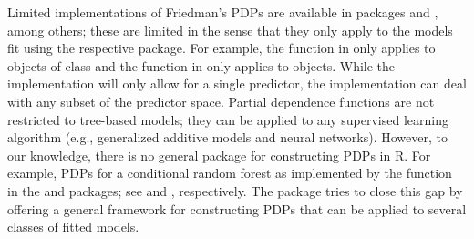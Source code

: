Limited implementations of Friedman's PDPs are available in packages  \citep{randomForest-pkg} and  \citep{gbm-pkg}, among others; these are limited in the sense that they only apply to the models fit using the respective package. For example, the  function in  only applies to objects of class  and the  function in  only applies to  objects. While the  implementation will only allow for a single predictor, the  implementation can deal with any subset of the predictor space. Partial dependence functions are not restricted to tree-based models; they can be applied to any supervised learning algorithm (e.g., generalized additive models and neural networks). However, to our knowledge, there is no general package for constructing PDPs in R. For example, PDPs for a conditional random forest as implemented by the  function in the  and  packages; see \citet{party-pkg} and \citet{partykit-pkg}, respectively. The  \citep{pdp-pkg} package tries to close this gap by offering a general framework for constructing PDPs that can be applied to several classes of fitted models.


